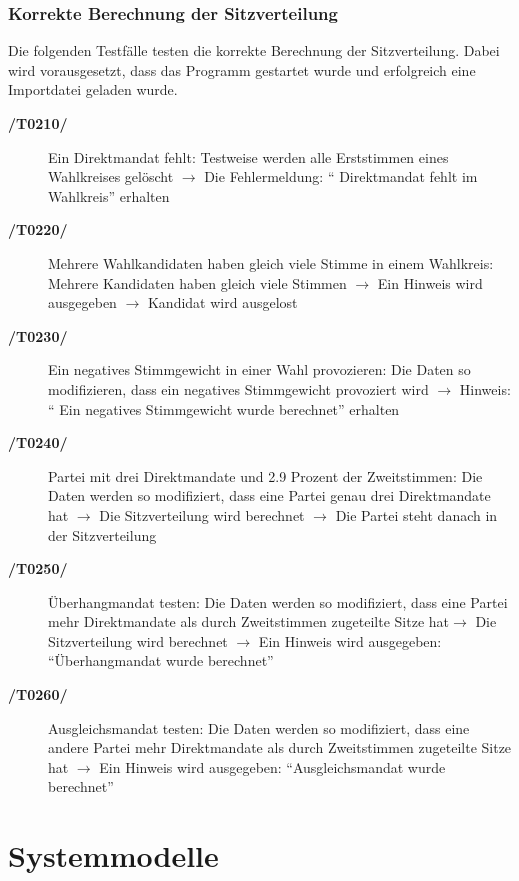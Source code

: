 \documentclass[10pt,a4paper]{article}
\begin{document}
\subsubsection{Korrekte Berechnung der Sitzverteilung}
Die folgenden Testfälle testen die korrekte Berechnung der Sitzverteilung. Dabei wird vorausgesetzt, dass  das Programm gestartet wurde und erfolgreich eine Importdatei geladen wurde.
\begin{description}
	\item[\textbf{/T0210/}] Ein Direktmandat fehlt: \newline
	Testweise werden alle Erststimmen eines Wahlkreises gelöscht $\rightarrow$ Die Fehlermeldung: `` Direktmandat fehlt im Wahlkreis'' erhalten
	\item[\textbf{/T0220/}] Mehrere Wahlkandidaten haben gleich viele Stimme in einem Wahlkreis: \newline
	Mehrere Kandidaten haben gleich viele Stimmen $\rightarrow$ Ein Hinweis wird ausgegeben $\rightarrow$ Kandidat wird ausgelost
	\item[\textbf{/T0230/}] Ein negatives Stimmgewicht in einer Wahl provozieren:\newline
	Die Daten so modifizieren, dass ein negatives Stimmgewicht provoziert wird $\rightarrow$ Hinweis: `` Ein negatives Stimmgewicht wurde berechnet'' erhalten
	\item[\textbf{/T0240/}] Partei mit drei Direktmandate und 2.9 Prozent der Zweitstimmen: \newline
	Die Daten werden so modifiziert, dass eine Partei genau drei Direktmandate hat $\rightarrow$ Die Sitzverteilung wird berechnet $\rightarrow$ Die Partei steht danach in der Sitzverteilung
	\item[\textbf{/T0250/}] Überhangmandat testen: \newline
	Die Daten werden so modifiziert, dass eine Partei mehr Direktmandate als durch Zweitstimmen zugeteilte Sitze hat$\rightarrow$ Die Sitzverteilung wird berechnet $\rightarrow$ Ein Hinweis wird ausgegeben: ``Überhangmandat wurde berechnet''
	\item[\textbf{/T0260/}] Ausgleichsmandat testen: \newline
	Die Daten werden so modifiziert, dass eine andere Partei mehr Direktmandate als durch Zweitstimmen zugeteilte Sitze hat $\rightarrow$ Ein Hinweis wird ausgegeben: ``Ausgleichsmandat wurde berechnet''
\end{description}


\section{Systemmodelle}
\end{document}
